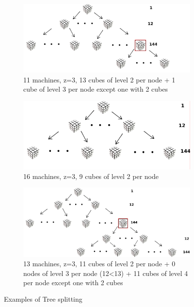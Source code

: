 \documentclass[a4paper]{article}
\begin{document}
\begin{figure}
\begin{subfigure}{0.5\textwidth}
\centering
\includegraphics[width=\linewidth]{rubik_tree_eval3}
\caption{11 machines, z=3, 13 cubes of level 2 per node + 1 cube of level 3 per node except one with 2 cubes} \label{fig:ev1}
\end{subfigure}
\hspace*{\fill} %
\begin{subfigure}{0.5\textwidth}
\centering
\includegraphics[width=\linewidth]{rubik_tree_eval5}
\caption{16 machines, z=3, 9 cubes of level 2 per node} \label{fig:ev2}
\end{subfigure} %
\begin{subfigure}{\textwidth}
\centering
\includegraphics[width=0.7\linewidth]{rubik_tree_eval4}
\caption{13 machines, z=3, 11 cubes of level 2 per node + 0 nodes of level 3 per node (12<13) + 11 cubes of level 4 per node except one with 2 cubes} \label{fig:ev3}
\end{subfigure}
\caption{Examples of Tree splitting} \label{fig:ports}
\end{figure}
\FloatBarrier
\end{document}
